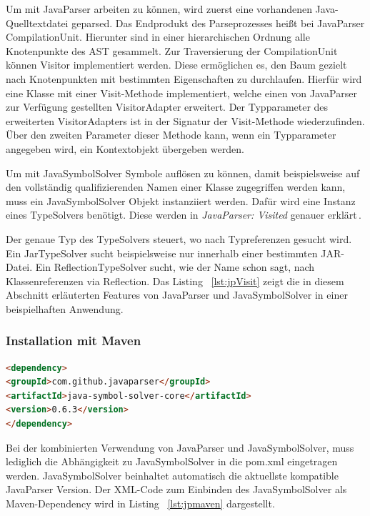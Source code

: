 \documentclass[12pt,oneside,a4paper,parskip]{scrbook}
\begin{document}
Um mit JavaParser arbeiten zu können, wird zuerst eine vorhandenen Java-Quelltextdatei geparsed. Das Endprodukt des Parseprozesses heißt bei JavaParser CompilationUnit. Hierunter sind in einer hierarchischen Ordnung alle Knotenpunkte des AST gesammelt. Zur Traversierung der CompilationUnit können Visitor implementiert werden. Diese ermöglichen es, den Baum gezielt nach Knotenpunkten mit bestimmten Eigenschaften zu durchlaufen. Hierfür wird eine Klasse mit einer Visit-Methode implementiert, welche einen von JavaParser zur Verfügung gestellten VisitorAdapter erweitert. Der Typparameter des erweiterten VisitorAdapters ist in der Signatur der Visit-Methode wiederzufinden. Über den zweiten Parameter dieser Methode kann, wenn ein Typparameter angegeben wird, ein Kontextobjekt übergeben werden.

Um mit JavaSymbolSolver Symbole auflösen zu können, damit beispielsweise auf den vollständig qualifizierenden Namen einer Klasse zugegriffen werden kann, muss ein JavaSymbolSolver Objekt instanziiert werden. Dafür wird eine Instanz eines TypeSolvers benötigt. Diese werden in \textit{JavaParser: Visited} genauer erklärt\,\cite[S. 39ff.]{javaparser2017}.

Der genaue Typ des TypeSolvers steuert, wo nach Typreferenzen gesucht wird. Ein JarTypeSolver sucht beispielsweise nur innerhalb einer bestimmten JAR-Datei. Ein ReflectionTypeSolver sucht, wie der Name schon sagt, nach Klassenreferenzen via Reflection. Das Listing ~\ref{lst:jpVisit} zeigt die in diesem Abschnitt erläuterten Features von JavaParser und JavaSymbolSolver in einer beispielhaften Anwendung.

\subsubsection{Installation mit Maven}

\begin{lstlisting}[label=lst:jpmaven,
language=HTML,
firstnumber=1,
caption=XML-Code zum Einbinden von JavaParser und JavaSymbolSolver als Maven-Dependency.]
<dependency>
<groupId>com.github.javaparser</groupId>
<artifactId>java-symbol-solver-core</artifactId>
<version>0.6.3</version>
</dependency>
\end{lstlisting}

Bei der kombinierten Verwendung von JavaParser und JavaSymbolSolver, muss lediglich die Abhängigkeit zu JavaSymbolSolver in die pom.xml eingetragen werden. JavaSymbolSolver beinhaltet automatisch die aktuellste kompatible JavaParser Version. Der XML-Code zum Einbinden des JavaSymbolSolver als Maven-Dependency wird in Listing ~\ref{lst:jpmaven} dargestellt.
\end{document}
